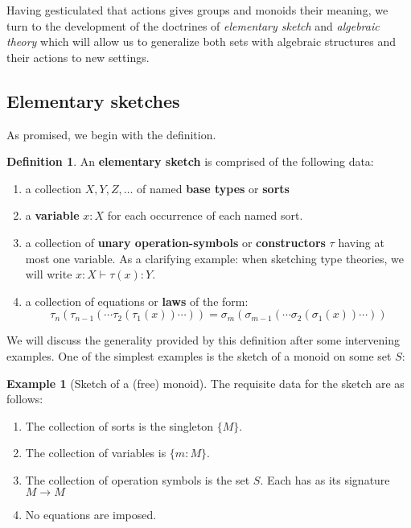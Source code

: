\documentclass[12pt,twoside]{reedthesis}
\theoremstyle{definition}
\newtheorem{definition}{Definition}
\newtheorem{example}{Example}
\theoremstyle{remark}
\theoremstyle{plain}
\begin{document}
Having gesticulated that actions gives groups and monoids their meaning, we turn
to the development of the doctrines of \emph{elementary sketch} and
\emph{algebraic theory} which will allow us to generalize both sets with
algebraic structures and their actions to new settings.

\subsection{Elementary sketches}
As promised, we begin with the definition.
\begin{definition}\label{def:elem sketch}
  An \textbf{elementary sketch} is comprised of the following data:
  \begin{enumerate}
    \item a collection \(X, Y, Z, \dots \) of named \textbf{base types} or
          \textbf{sorts}
    \item a \textbf{variable} \(x:X\) for each occurrence of each named sort.
    \item a collection of \textbf{unary operation-symbols} or
          \textbf{constructors} \(\tau\) having at most one variable. As a
          clarifying example: when sketching type theories, we will write
          \( x:X \vdash \tau(x) : Y \).
    \item a collection of equations or \textbf{laws} of the
          form: \[ \tau_n (\tau_{n-1}(\cdots \tau_2 (\tau_1 (x))\cdots )) = \sigma_m (\sigma_{m-1}(\cdots \sigma_2 (\sigma_1 (x))\cdots )) \]
  \end{enumerate}
\end{definition}
We will discuss the generality provided by this definition after some
intervening examples. One of the simplest examples is the sketch of a monoid on
some set $S$:

\begin{example}[Sketch of a (free) monoid]\label{ex:monoid sketch}
  The requisite data for the sketch are as follows:
  \begin{enumerate}
    \item The collection of sorts is the singleton \( \{M\} \).
    \item The collection of variables is \( \{m:M\} \).
    \item The collection of operation symbols is the set \( S \). Each has as its signature \( M \rightarrow M \)
    \item No equations are imposed.
  \end{enumerate}
\end{example}
\end{document}
